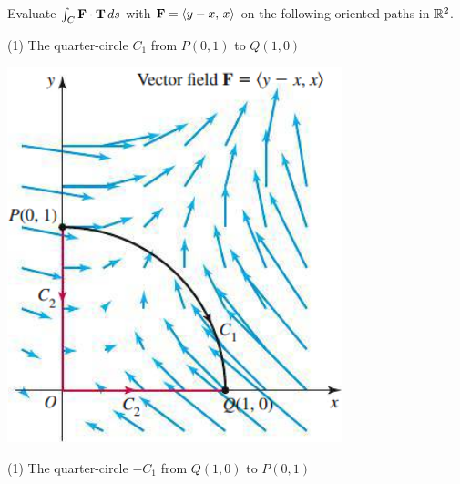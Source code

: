 \documentclass[../mathNotesPreamble]{subfiles}
\begin{document}
  \begin{ex*}
    Evaluate $\int_C \mathbf F\cdot{\mathbf{T}}\,ds$ with $\mathbf F={\left\langle y-x,\,x \right\rangle}$ on the following oriented paths in $\mathbb{R}^2$.
  \end{ex*}
  \vspace*{-\baselineskip}
  \noindent
  \begin{minipage}[t]{0.6\linewidth}\mbox{}
    \begin{tasks}[after-item-skip=8\baselineskip, label=\alph*)](1)
      \task 
        The quarter-circle $C_1$ from $P(0,1)$ to $Q(1,0)$
    \end{tasks}
  \end{minipage}
  \begin{minipage}[t]{0.4\linewidth}\mbox{}
    \begin{flushright}
      \includegraphics[width=0.75\linewidth]{../images/briggs_17_02/fig17_20}
    \end{flushright}
  \end{minipage}
  \begin{tasks}[after-item-skip=\stretch{1}, label=\alph*), resume](1)
      \task 
        The quarter-circle $-C_1$ from $Q(1,0)$ to $P(0,1)$
  \end{tasks}
  \pagebreak
\end{document}
